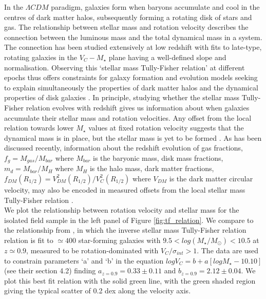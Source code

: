 \documentclass[fleqn,usenatbib]{mnras}
\begin{document}
In the $\Lambda CDM$ paradigm, galaxies form when baryons accumulate and cool in the centres of dark matter halos, subsequently forming a rotating disk of stars and gas.
The relationship between stellar mass and rotation velocity describes the connection between the luminous mass and the total dynamical mass in a system.
The connection has been studied extensively at low redshift \citep[e.g.][]{Bell2000a,Rhee2003,Reyes2011} with fits to late-type, rotating galaxies in the $V_{C}-M_{\star}$ plane having a well-defined slope and normalisation.
Observing this `stellar mass Tully-Fisher relation' at different epochs thus offers constraints for galaxy formation and evolution models seeking to explain simultaneously the properties of dark matter halos and the dynamical properties of disk galaxies \citep[e.g.][]{Dubois2014,Vogelsberger2014b,Schaye2015}.
In principle, studying whether the stellar mass Tully-Fisher relation evolves with redshift gives us information about when galaxies accumulate their stellar mass and rotation velocities.
Any offset from the local relation towards lower $M_{\star}$ values at fixed rotation velocity suggests that the dynamical mass is in place, but the stellar mass is yet to be formed \citep[e.g.][]{Puech2008,Cresci2009,Puech2010,Gnerucci2011,Swinbank2012,Straatman2017,Ubler2017}.
As has been discussed recently, information about the redshift evolution of gas fractions, $f_{g} = M_{gas}/M_{bar}$ where $M_{bar}$ is the baryonic mass, disk mass fractions, $m_{d} = M_{bar}/M_{H}$  where $M_{H}$ is the halo mass, dark matter fractions, $f_{DM}(R_{1/2}) = V^{2}_{DM}(R_{1/2})/V^{2}_{C}(R_{1/2})$ where $V_{DM}$ is the dark matter circular velocity, may also be encoded in measured offsets from the local stellar mass Tully-Fisher relation \citep{Wuyts2016b,Ubler2017,Genzel2017}.  \\

\noindent
We plot the relationship between rotation velocity and stellar mass for the isolated field sample in the left panel of Figure \ref{fig:tf_relation}.
We compare to the relationship from \cite{Harrison2017}, in which the inverse stellar mass Tully-Fisher relation relation is fit to $\simeq400$ star-forming galaxies with $9.5 < log(M_{\star}/M_{\odot}) < 10.5$ at $z\simeq0.9$, measured to be rotation-dominated with $V_{C}/\sigma_{int} > 1$.
The data are used to constrain parameters `a' and `b' in the equation $logV_{C}=b+a[logM_{\star} - 10.10]$ (see their section 4.2) finding $a_{z=0.9} = 0.33 \pm 0.11$ and $b_{z=0.9} = 2.12 \pm 0.04$.
We plot this best fit relation with the solid green line, with the green shaded region giving the typical scatter of 0.2 dex along the velocity axis.
\end{document}
